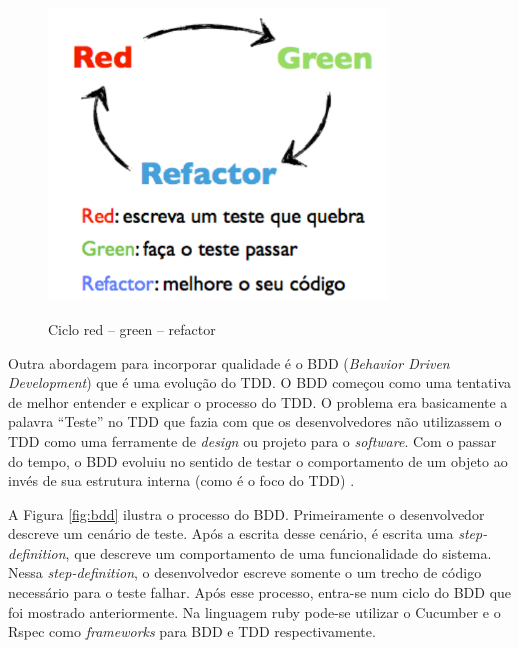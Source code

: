 \begin{figure}[htb!]
\begin{center}
\caption{Ciclo red -- green -- refactor}
\label{fig:tdd}
\includegraphics[width=9cm]{assets/tdd} \\
\end{center}
\end{figure}	

Outra abordagem para incorporar qualidade é o BDD (\textit{Behavior Driven Development}) que é uma evolução do TDD. O BDD começou como uma tentativa de melhor entender e explicar o processo do TDD. O problema era basicamente a palavra ``Teste'' no TDD que fazia com que os desenvolvedores não utilizassem o TDD como uma ferramente de \textit{design} ou projeto para o \textit{software}. Com o passar do tempo, o BDD evoluiu no sentido de testar o comportamento de um objeto ao invés de sua estrutura interna (como é o foco do TDD) \cite{chelimsky:12}. 


A Figura \ref{fig:bdd} ilustra o processo do BDD. Primeiramente o desenvolvedor descreve um cenário de teste. Após a escrita desse cenário, é escrita uma \textit{step-definition}, que descreve um comportamento de uma funcionalidade do sistema. Nessa \textit{step-definition}, o desenvolvedor escreve somente o um trecho de código necessário para o teste falhar. Após esse processo, entra-se num ciclo do BDD que foi mostrado anteriormente. Na linguagem ruby pode-se utilizar o Cucumber e o Rspec como \textit{frameworks} para BDD e TDD respectivamente.

